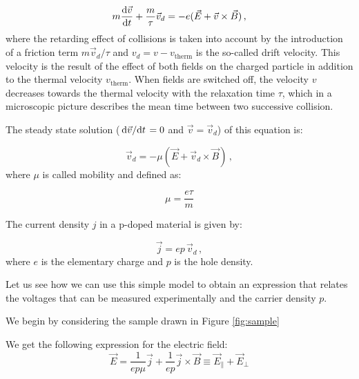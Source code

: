 \documentclass[11pt,a4paper]{article}
\begin{document}
\begin{equation}\label{eq:Drude}
m\dv{\vec{v}}{t}+\frac{m}{\tau}\vec{v}_d=-e(\vec{E}+\vec{v}\times\vec{B})\,,
\end{equation}
where the retarding effect of collisions is taken into account by the introduction of a friction term $m\vec{v}_d/\tau$ and $v_d=v-v_\text{therm}$ is the so-called drift velocity. This velocity is the result of the effect of both fields on the charged particle in addition to the thermal velocity $v_\text{therm}$. When fields are switched off, the velocity $v$ decreases towards the thermal velocity with the relaxation time $\tau$, which in a microscopic picture describes the mean time between two successive collision.

The steady state solution ($\dv*{\vec{v}}{t}=0$ and $\vec{v}=\vec{v}_d$) of this equation is:

\begin{equation*}
\vec{v}_d=-\mu (\vec{E}+\vec{v}_d\times\vec{B})\,,
\end{equation*}
where $\mu$ is called mobility and defined as:

\begin{equation}\label{eq:mobility}
\mu=\frac{e\tau}{m}
\end{equation}

The current density $j$ in a p-doped material is given by:

\begin{equation*}
\vec{j}=ep\,\vec{v}_d\,,
\end{equation*}
where $e$ is the elementary charge and $p$ is the hole density.

Let us see how we can use this simple model to obtain an expression that relates the voltages that can be measured experimentally and the carrier density $p$.

We begin by considering the sample drawn in Figure \ref{fig:sample}

\vspace{3cm}

We get the following expression for the electric field:
\begin{equation*}
\vec{E}=\frac{1}{ep\mu}\vec{j}+\frac{1}{ep}\vec{j}\times\vec{B}\equiv \vec{E}_\parallel+\vec{E}_\perp
\end{equation*}
\end{document}
